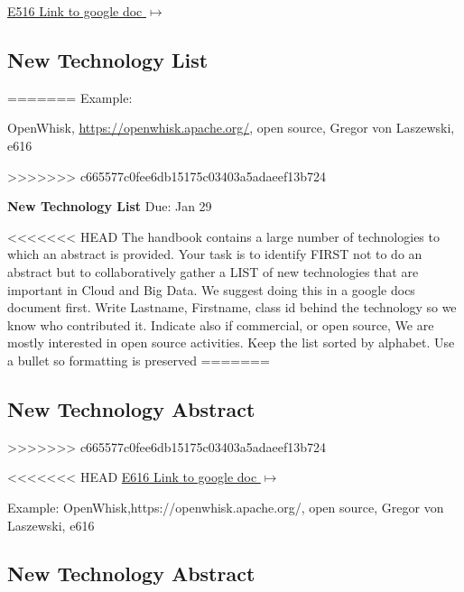 \begin{exercise}
\begin{exercise}
  {\hfill \href{https://docs.google.com/document/d/1ZHNdhX_Jx7uBQo0kthSYQ6TQR8_KNbgOwH2EuqBQcjY/edit?usp=sharing}{E516 Link to google doc $\mapsto$}}

\end{exercise}

\subsection{New Technology List}
=======
Example: 

OpenWhisk, \url{https://openwhisk.apache.org/}, open source, Gregor von Laszewski, e616

\end{exercise}

>>>>>>> c665577c0fee6db15175c03403a5adaeef13b724

\begin{exercise} \label{a:e6161-new-tech-list}

{\bf New Technology List} Due: Jan 29 

<<<<<<< HEAD
The handbook contains a large number of technologies to which an abstract is provided. Your task is to identify FIRST not to do an abstract but to collaboratively gather a LIST of new technologies that are important in Cloud and Big Data. We suggest doing this in a google docs document first. Write Lastname, Firstname, class id behind the technology so we know who contributed it. Indicate also if commercial, or open source, We are mostly interested in open source activities. Keep the list sorted by alphabet. Use a bullet so formatting is preserved
=======
\subsection{New Technology Abstract}
>>>>>>> c665577c0fee6db15175c03403a5adaeef13b724

\begin{exercise} \label{E:new-tech-abstract}
 
<<<<<<< HEAD
{\hfill \href{https://docs.google.com/document/d/1LeHGHTSBbaPXYVor0efhmi5W7JJjS7EQHABHqgRAPuU/edit?usp=sharing}{E616 Link to google doc $\mapsto$}}
 
Example: OpenWhisk,https://openwhisk.apache.org/, open source, Gregor von Laszewski, e616
 
\end{exercise}


\subsection{New Technology Abstract}


\end{exercise}
